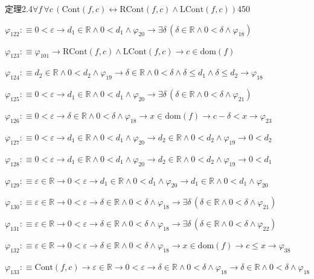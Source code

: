 \begin{fullproof}{定理2.4}{$\forall f\,\forall c\,(\mathrm{Cont}(f,c) \leftrightarrow \mathrm{RCont}(f,c) \land \mathrm{LCont}(f,c))$}{450}
\begin{abbrevlist}
\item $\varphi_{122} :\equiv 0 < \varepsilon \to d_{1} \in \mathbb{R} \land 0 < d_{1} \land \varphi_{20} \to \exists \delta\,(\delta \in \mathbb{R} \land 0 < \delta \land \varphi_{18})$
\item $\varphi_{123} :\equiv \varphi_{101} \to \mathrm{RCont}(f,c) \land \mathrm{LCont}(f,c) \to c \in \mathrm{dom}(f)$
\item $\varphi_{124} :\equiv d_{2} \in \mathbb{R} \land 0 < d_{2} \land \varphi_{19} \to \delta \in \mathbb{R} \land 0 < \delta \land \delta \leq d_{1} \land \delta \leq d_{2} \to \varphi_{18}$
\item $\varphi_{125} :\equiv 0 < \varepsilon \to d_{1} \in \mathbb{R} \land 0 < d_{1} \land \varphi_{20} \to \exists \delta\,(\delta \in \mathbb{R} \land 0 < \delta \land \varphi_{21})$
\item $\varphi_{126} :\equiv 0 < \varepsilon \to \delta \in \mathbb{R} \land 0 < \delta \land \varphi_{18} \to x \in \mathrm{dom}(f) \to c - \delta < x \to \varphi_{23}$
\item $\varphi_{127} :\equiv 0 < \varepsilon \to d_{1} \in \mathbb{R} \land 0 < d_{1} \land \varphi_{20} \to d_{2} \in \mathbb{R} \land 0 < d_{2} \land \varphi_{19} \to 0 < d_{2}$
\item $\varphi_{128} :\equiv 0 < \varepsilon \to d_{1} \in \mathbb{R} \land 0 < d_{1} \land \varphi_{20} \to d_{2} \in \mathbb{R} \land 0 < d_{2} \land \varphi_{19} \to 0 < d_{1}$
\item $\varphi_{129} :\equiv \varepsilon \in \mathbb{R} \to 0 < \varepsilon \to d_{1} \in \mathbb{R} \land 0 < d_{1} \land \varphi_{20} \to d_{1} \in \mathbb{R} \land 0 < d_{1} \land \varphi_{20}$
\item $\varphi_{130} :\equiv \varepsilon \in \mathbb{R} \to 0 < \varepsilon \to \delta \in \mathbb{R} \land 0 < \delta \land \varphi_{18} \to \exists \delta\,(\delta \in \mathbb{R} \land 0 < \delta \land \varphi_{21})$
\item $\varphi_{131} :\equiv \varepsilon \in \mathbb{R} \to 0 < \varepsilon \to \delta \in \mathbb{R} \land 0 < \delta \land \varphi_{18} \to \exists \delta\,(\delta \in \mathbb{R} \land 0 < \delta \land \varphi_{22})$
\item $\varphi_{132} :\equiv \varepsilon \in \mathbb{R} \to 0 < \varepsilon \to \delta \in \mathbb{R} \land 0 < \delta \land \varphi_{18} \to x \in \mathrm{dom}(f) \to c \leq x \to \varphi_{38}$
\item $\varphi_{133} :\equiv \mathrm{Cont}(f,c) \to \varepsilon \in \mathbb{R} \to 0 < \varepsilon \to \delta \in \mathbb{R} \land 0 < \delta \land \varphi_{18} \to \delta \in \mathbb{R} \land 0 < \delta \land \varphi_{18}$

\end{abbrevlist}
\end{fullproof}

